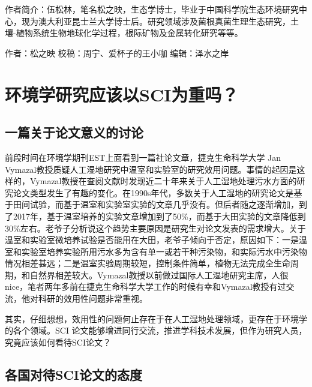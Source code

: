 \documentclass[
]{book}
\begin{document}
作者简介：伍松林，笔名松之映，生态学博士，毕业于中国科学院生态环境研究中心，现为澳大利亚昆士兰大学博士后。研究领域涉及菌根真菌生理生态研究，土壤-植物系统生物地球化学过程，根际矿物及金属转化研究等等。

作者：松之映
校稿：周宁、爱杯子的王小咖
编辑：泽水之岸

\hypertarget{ux73afux5883ux5b66ux7814ux7a76ux5e94ux8be5ux4ee5sciux4e3aux91cdux5417}{%
\section{环境学研究应该以SCI为重吗？}\label{ux73afux5883ux5b66ux7814ux7a76ux5e94ux8be5ux4ee5sciux4e3aux91cdux5417}}

\hypertarget{ux4e00ux7bc7ux5173ux4e8eux8bbaux6587ux610fux4e49ux7684ux8ba8ux8bba}{%
\subsection{一篇关于论文意义的讨论}\label{ux4e00ux7bc7ux5173ux4e8eux8bbaux6587ux610fux4e49ux7684ux8ba8ux8bba}}

前段时间在环境学期刊EST上面看到一篇社论文章，捷克生命科学大学 Jan Vymazal教授质疑人工湿地研究中温室和实验室的研究效用问题。事情的起因是这样的，Vymazal教授在查阅文献时发现近二十年来关于人工湿地处理污水方面的研究论文类型发生了有趣的变化。在1990s年代，多数关于人工湿地的研究论文是基于田间试验，而基于温室和实验室实验的文章几乎没有。但后者随之逐渐增加，到了2017年，基于温室培养的实验文章增加到了50\%，而基于大田实验的文章降低到30\%左右。老爷子分析说这个趋势主要原因是研究生对论文发表的需求增大。关于温室和实验室微培养试验是否能用在大田，老爷子倾向于否定，原因如下：一是温室和实验室培养实验所用污水多为含有单一或若干种污染物，和实际污水中污染物情况相差甚远；二是温室实验周期较短，控制条件简单，植物无法完成全生命周期，和自然界相差较大。Vymazal教授以前做过国际人工湿地研究主席，人很nice，笔者两年多前在捷克生命科学大学工作的时候有幸和Vymazal教授有过交流，他对科研的效用性问题非常重视。

其实，仔细想想，效用性的问题何止存在于在人工湿地处理领域，更存在于环境学的各个领域。SCI 论文能够增进同行交流，推进学科技术发展，但作为研究人员，究竟应该如何看待SCI论文？

\hypertarget{ux5404ux56fdux5bf9ux5f85sciux8bbaux6587ux7684ux6001ux5ea6}{%
\subsection{各国对待SCI论文的态度}\label{ux5404ux56fdux5bf9ux5f85sciux8bbaux6587ux7684ux6001ux5ea6}}
\end{document}
